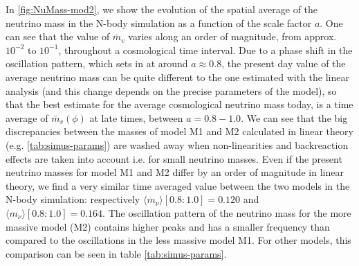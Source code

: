 In \cref{fig:NuMass-mod2}, we show the evolution of the spatial
average of the neutrino mass in the N-body simulation as a function
of the scale factor $a$. One can see that the value of $\bar{m}_{v}$
varies along an order of magnitude, from approx.$10^{-2}$ to $10^{-1}$,
throughout a cosmological time interval. Due to a phase shift in the
oscillation pattern, which sets in at around $a\approx0.8$, the present
day value of the average neutrino mass can be quite different to the
one estimated with the linear analysis (and this change depends on
the precise parameters of the model), so that the best estimate for
the average cosmological neutrino mass today, is a time average of
$\bar{m}_{v}(\phi)$ at late times, between $a=0.8-1.0$. We can see
that the big discrepancies between the masses of model M1 and M2 calculated
in linear theory (e.g. \ref{tab:simus-params}) are washed away
when non-linearities and backreaction effects are taken into account
i.e. for small neutrino masses. Even if the present neutrino masses
for model M1 and M2 differ by an order of magnitude in linear theory,
we find a very similar time averaged value between the two models
in the N-body simulation: respectively $\langle m_{\nu}\rangle[0.8:1.0]=0.120$
and $\langle m_{\nu}\rangle[0.8:1.0]=0.164$. The oscillation pattern
of the neutrino mass for the more massive model (M2) contains higher
peaks and has a smaller frequency than compared to the oscillations
in the less massive model M1. For other models, this comparison can
be seen in table \ref{tab:simus-params}.

